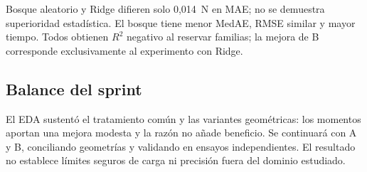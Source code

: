 Bosque aleatorio y Ridge difieren solo 0,014~N en MAE; no se demuestra superioridad estadística. El bosque tiene menor MedAE, RMSE similar y mayor tiempo. Todos obtienen $R^2$ negativo al reservar familias; la mejora de B corresponde exclusivamente al experimento con Ridge.

\subsection{Balance del sprint}
El EDA sustentó el tratamiento común y las variantes geométricas: los momentos aportan una mejora modesta y la razón no añade beneficio. Se continuará con A y B, conciliando geometrías y validando en ensayos independientes. El resultado no establece límites seguros de carga ni precisión fuera del dominio estudiado.
